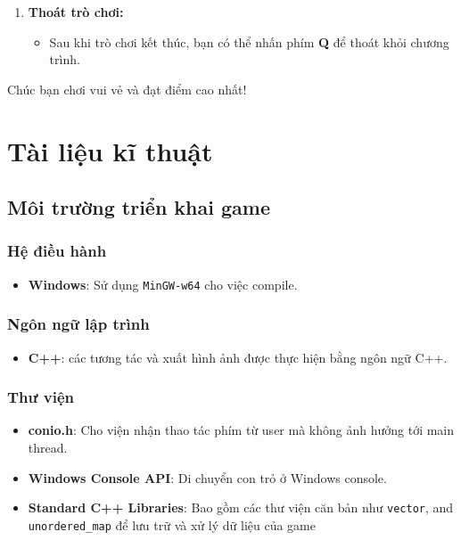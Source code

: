 \documentclass[12pt]{report}
\begin{document}
\begin{enumerate}[label=\arabic*.]
    \item \textbf{Thoát trò chơi:}
    \begin{itemize}
        \item Sau khi trò chơi kết thúc, bạn có thể nhấn phím \textbf{Q} để thoát khỏi chương trình.
    \end{itemize}
\end{enumerate}

Chúc bạn chơi vui vẻ và đạt điểm cao nhất!

\chapter{Tài liệu kĩ thuật}
\label{sec:technical_detail}
\section{Môi trường triển khai game}
\subsection*{Hệ điều hành}
\begin{itemize}
    \item \textbf{Windows}: Sử dụng \texttt{MinGW-w64} cho việc compile.
\end{itemize}

\subsection*{Ngôn ngữ lập trình}
\begin{itemize}
    \item \textbf{C++}: các tương tác và xuất hình ảnh được thực hiện bằng ngôn ngữ C++.
\end{itemize}

\subsection*{Thư viện}
\begin{itemize}
    \item \textbf{conio.h}: Cho viện nhận thao tác phím từ user mà không ảnh hưởng tới main thread.
    \item \textbf{Windows Console API}: Di chuyển con trỏ ở Windows console.
    \item \textbf{Standard C++ Libraries}: Bao gồm các thư viện căn bản như \texttt{vector}, and \texttt{unordered\_map} để lưu trữ và xử lý dữ liệu của game
\end{itemize}
\end{document}
